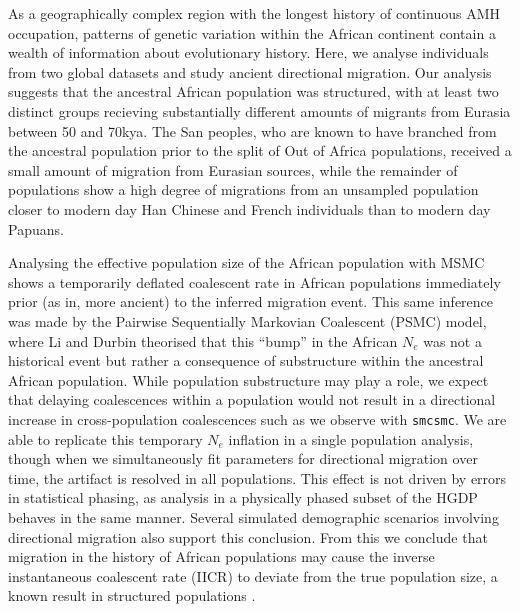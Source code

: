 \documentclass{article}
\begin{document}
As a geographically complex region with the longest history of continuous AMH occupation, patterns of genetic variation within the African continent contain a wealth of information about evolutionary history. Here, we analyse individuals from two global datasets and study ancient directional migration. Our analysis suggests that the ancestral African population was structured, with at least two distinct groups recieving substantially different amounts of migrants from Eurasia between 50 and 70kya. The San peoples, who are known to have branched from the ancestral population prior to the split of Out of Africa populations, received a small amount of migration from Eurasian sources, while the remainder of populations show a high degree of migrations from an unsampled population closer to modern day Han Chinese and French individuals than to modern day Papuans. 

Analysing the effective population size of the African population with MSMC shows a temporarily deflated coalescent rate in African populations immediately prior (as in, more ancient) to the inferred migration event. This same inference was made by the Pairwise Sequentially Markovian Coalescent (PSMC) model, where Li and Durbin theorised that this ``bump'' in the African $N_e$ was not a historical event but rather a consequence of substructure within the ancestral African population. While population substructure may play a role, we expect that delaying coalescences within a population would not result in a directional increase in cross-population coalescences such as we observe with {\tt smcsmc}. We are able to replicate this temporary $N_e$ inflation in a single population analysis, though when we simultaneously fit parameters for directional migration over time, the artifact is resolved in all populations. This effect is not driven by errors in statistical phasing, as analysis in a physically phased subset of the HGDP behaves in the same manner. Several simulated demographic scenarios involving directional migration also support this conclusion. From this we conclude that migration in the history of African populations may cause the inverse instantaneous coalescent rate (IICR) to deviate from the true population size, a known result in structured populations \cite{Chikhi2018}.
\end{document}
